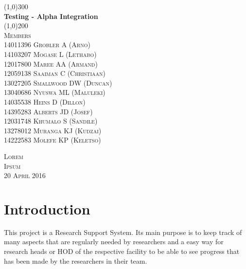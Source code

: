 \documentclass{article}
\begin{document}
\begin{titlepage}
    \begin{center}
        \line(1,0){300}\\
        [6mm]
        \huge{\bfseries Testing - Alpha Integration}\\
        [2mm]
        \line(1,0){200}\\
        [15mm]
        \textsc{\large Members}\\
        [7.5mm]
        \textsc{
                \large14011396  Grobler A (Arno) \\
                14103207    Mogase  L (Lethabo)\\
                12017800    Maree   AA (Armand)\\
                12059138    Saaiman C (Christiaan)\\
                13027205    Smallwood   DW (Duncan)\\
                13040686    Nyuswa  ML (Maluleki)\\
                14035538    Heins   D (Dillon)\\
                14395283    Alberts JD (Josef)\\
                12031748    Khumalo S (Sandile)\\
                13278012    Muranga KJ (Kudzai)\\
                14222583    Molefe  KP (Keletso)\\
                [8.5cm]
            }

    \end{center}

    \begin{flushright}
        \textsc{\large Lorem\\
        Ipsum\\
        20 April 2016\\}
    \end{flushright}
\end{titlepage}

\tableofcontents
\thispagestyle{empty}
\cleardoublepage
%

\setcounter{page}{1}
%

\section{Introduction}\label{sec:intro}
    This project is a Research Support System. Its main purpose is to keep track of many aspects that are regularly needed by researchers and a easy way for research heads or HOD of the respective facility to be able to see progress that has been made by the researchers in their team.
    
\end{document}
